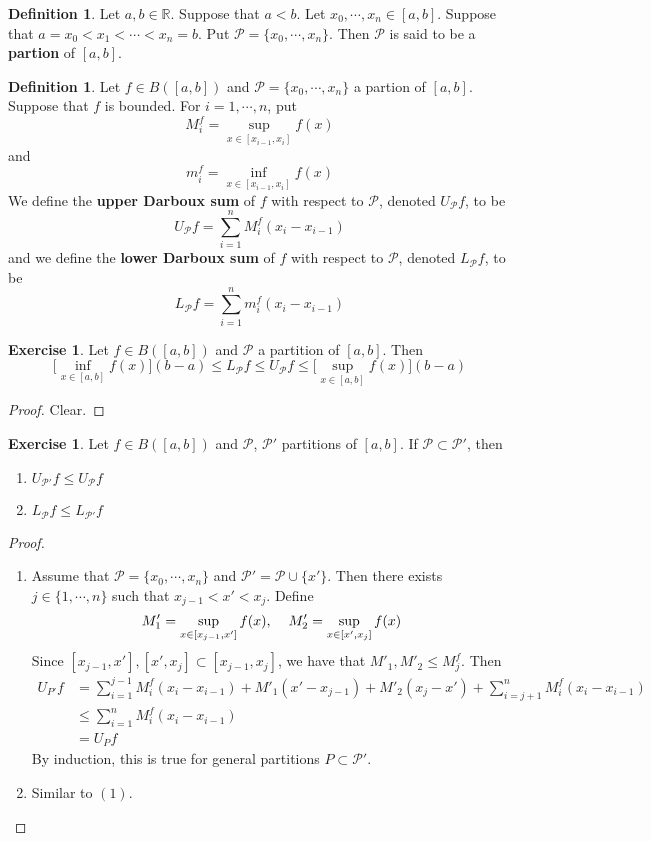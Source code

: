 \documentclass{book}
\theoremstyle{definition}
\newtheorem{defn}[definition]{Definition}
\newtheorem{ex}[definition]{Exercise}
\newcommand{\R}{\mathbb{R}}
\newcommand{\MP}{\mathcal{P}}
\newcommand{\lex}[1]{\label{ex:#1}}
\newcommand{\ld}[1]{\label{defn:#1}}
\DeclareMathOperator*{\0}{\mbf{0}}
\DeclareMathOperator*{\1}{\mbf{1}}
\begin{document}
	\begin{defn} \ld{00000} 
		Let $a,b \in \R$. Suppose that $a<b$. Let $x_0, \cdots, x_n \in [a,b]$. Suppose that $a= x_0 < x_1 < \cdots < x_n = b$. Put $\MP = \{x_0, \cdots, x_n\}$. Then $\MP$ is said to be a \textbf{partion} of $[a,b]$. 
	\end{defn}
	
	\begin{defn} \ld{00000} 
		Let $f \in B([a,b])$ and $\MP = \{x_0, \cdots, x_n\}$ a partion of $[a,b]$. Suppose that $f$ is bounded. For $i = 1, \cdots, n$, put 
		$$M^f_i = \sup_{x \in [x_{i-1}, x_i]} f(x)$$ and 
		$$m^f_i = \inf_{x \in [x_{i-1}, x_i]} f(x)$$ 
		We define the \textbf{upper Darboux sum} of $f$ with respect to $\MP$, denoted $U_\MP f$, to be $$U_\MP f = \sum_{i=1}^n M^f_i (x_i - x_{i-1})$$ 
		and we define the \textbf{lower Darboux sum} of $f$ with respect to $\MP$, denoted $L_\MP f$, to be
		$$L_\MP f = \sum_{i=1}^n m^f_i (x_i - x_{i-1})$$ 
	\end{defn}

	\begin{ex} \lex{00000} 
		Let $f \in B([a,b])$ and $\MP$ a partition of $[a,b]$. Then $$\bigg[\inf_{x \in [a,b]} f(x) \bigg] (b-a) \leq L_\MP f \leq U_\MP f \leq \bigg[ \sup_{x \in [a,b]} f(x)  \bigg] (b-a)$$
	\end{ex}

	\begin{proof}
		Clear.
	\end{proof}

	\begin{ex} \lex{00000} 
			Let $f \in B([a,b])$ and $\MP$, $\MP'$ partitions of $[a,b]$. If $\MP \subset \MP'$, then 
			\begin{enumerate}
				\item $U_{\MP'} f \leq U_{\MP} f$
				\item $L_{\MP} f \leq L_{\MP'} f$
			\end{enumerate}
	\end{ex}

	\begin{proof} \
		\begin{enumerate}
			\item Assume that $\MP = \{x_0, \cdots, x_n\}$ and $\MP' = \MP \cup \{x'\}$. Then there exists $j \in \{1, \cdots, n\}$ such that $x_{j-1} < x' < x_j$. Define $$M'_1 = \sup_{x \in [x_{j-1}, x']} f(x), \hspace{.4cm} M'_2 = \sup_{x \in [x', x_{j}]} f(x)$$
			Since $[x_{j-1}, x'], [x', x_j] \subset [x_{j-1}, x_j]$, we have that $M'_1, M'_2 \leq  M^f_j$. Then 
			\begin{align*}
				U_{P'}f 
				&= \sum_{i =1}^{j-1} M^f_i(x_i - x_{i-1}) + M'_1(x' - x_{j-1}) + M'_2(x_j - x') + \sum_{i =j+1}^n M^f_i(x_i - x_{i-1})  \\
				&\leq   \sum_{i =1}^{n} M^f_i(x_i - x_{i-1}) \\
				&= U_P f 
			\end{align*}
			By induction, this is true for general partitions $P \subset \MP'$.
			\item Similar to $(1)$.
		\end{enumerate}
	\end{proof}
\end{document}
